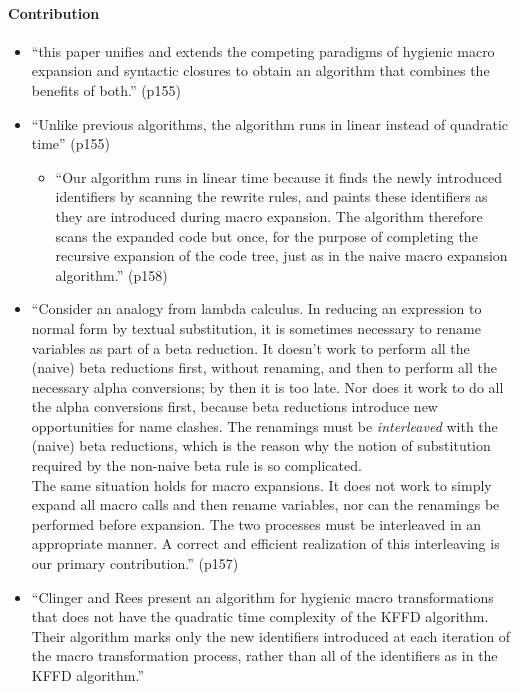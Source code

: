 \documentclass[12pt]{article}	%
\begin{document}
\paragraph{Contribution}
\begin{itemize}
	\item ``this paper unifies and extends the competing paradigms of hygienic macro expansion and syntactic closures to obtain an algorithm that combines the benefits of both.'' (p155)
	\item ``Unlike previous algorithms, the algorithm runs in linear instead of quadratic time'' (p155)
		\begin{itemize}
			\item ``Our algorithm runs in linear time because it finds the newly introduced identifiers by scanning the rewrite rules, and paints these identifiers as they are introduced during macro expansion. The algorithm therefore scans the expanded code but once, for the purpose of completing the recursive expansion of the code tree, just as in the naive macro expansion algorithm.'' (p158)
		\end{itemize}
	\item ``Consider an analogy from lambda calculus. In reducing an expression to normal form by textual substitution, it is sometimes necessary to rename variables as part of a beta reduction. It doesn't work to perform all the (naive) beta reductions first, without renaming, and then to perform all the necessary alpha conversions; by then it is too late. Nor does it work to do all the alpha conversions first, because beta reductions introduce new opportunities for name clashes. The renamings must be \textit{interleaved} with the (naive) beta reductions, which is the reason why the notion of substitution required by the non-naive beta rule is so complicated. \\

The same situation holds for macro expansions. It does not work to simply expand all macro calls and then rename variables, nor can the renamings be performed before expansion. The two processes must be interleaved in an appropriate manner. A correct and efficient realization of this interleaving is our primary contribution.'' (p157)
	\item ``Clinger and Rees present an algorithm for hygienic macro transformations that does not have the quadratic time complexity of the KFFD algorithm. Their algorithm marks only the new identifiers introduced at each iteration of the macro transformation process, rather than all of the identifiers as in the KFFD algorithm.''~\cite[p298]{Dybvig1992Syntactic}
\end{itemize}
\end{document}
